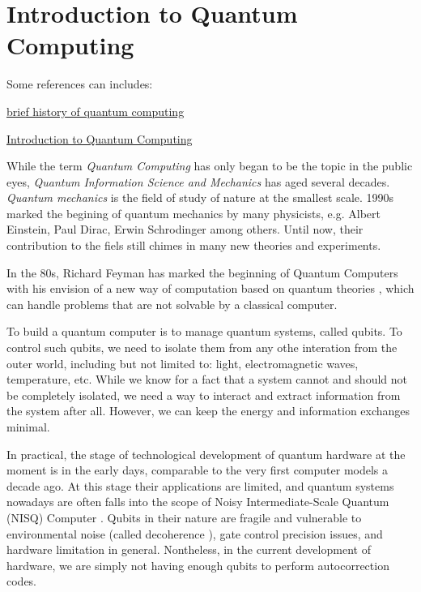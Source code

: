 \section{Introduction to Quantum Computing} \label{Sec: Introduction to Quantum Computing}
\begin{framed}
    Some references can includes:

    \href{https://www.sri.com/story/a-brief-introduction-to-quantum-computing/#:~:text=Quantum%20computing%20is%20generally%20viewed,the%20atomic%20and%20subatomic%20level.}{brief history of quantum computing}

    \href{https://www.intechopen.com/chapters/73811}{Introduction to Quantum Computing}
\end{framed}

While the term \emph{Quantum Computing} has only began to be the topic in the public eyes, \emph{Quantum Information Science and Mechanics} has aged several decades.
\emph{Quantum mechanics} is the field of study of nature at the smallest scale.
1990s marked the begining of quantum mechanics by many physicists, e.g. Albert Einstein, Paul Dirac, Erwin Schrodinger among others.
Until now, their contribution to the fiels still chimes in many new theories and experiments.

In the 80s, Richard Feyman has marked the beginning of Quantum Computers with his envision of a new way of computation based on quantum theories \cite{feynmanSimulatingPhysicsComputers1982}, which can handle problems that are not solvable by a classical computer.

To build a quantum computer is to manage quantum systems, called qubits.
To control such qubits, we need to isolate them from any othe interation from the outer world, including but not limited to: light, electromagnetic waves, temperature, etc. 
While we know for a fact that a system cannot and should not be completely isolated, we need a way to interact and extract information from the system after all.
However, we can keep the energy and information exchanges minimal.

In practical, the stage of technological development of quantum hardware at the moment is in the early days, comparable to the very first computer models a decade ago.
At this stage their applications are limited, and quantum systems nowadays are often falls into the scope of Noisy Intermediate-Scale Quantum (NISQ) Computer \cite{brooksQuantumSupremacyHunt2019}.
Qubits in their nature are fragile and vulnerable to environmental noise (called decoherence \cite{brooksQuantumSupremacyHunt2019}), gate control precision issues, and hardware limitation in general.
Nontheless, in the current development of hardware, we are simply not having enough qubits to perform autocorrection codes.

